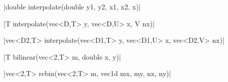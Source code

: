 \funcitem \cppinline|double interpolate(double y1, y2, x1, x2, x)| 

\cppinline|T interpolate(vec<D,T> y, vec<D,U> x, V nx)|

\cppinline|vec<D2,T> interpolate(vec<D1,T> y, vec<D1,U> x, vec<D2,V> nx)|

\funcitem \cppinline|T bilinear(vec<2,T> m, double x, y)| 

\funcitem \cppinline|vec<2,T> rebin(vec<2,T> m, vec1d mx, my, nx, ny)| 
